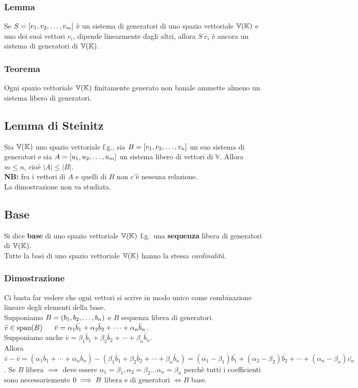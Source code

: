 \documentclass[../main.tex]{subfiles}
\begin{document}
\subsubsection{Lemma}
Se $S = [v_1, v_2, \ldots, v_{m}]$ è un sistema di generatori di uno spazio vettoriale $\mathbb{V} (\mathbb{K})$ e
uno dei suoi vettori $v_i$, dipende linearmente dagli altri, allora $S \ {v_i}$
è ancora un sistema di generatori di $\mathbb{V} (\mathbb{K})$.

\subsubsection{Teorema}
Ogni spazio vettoriale $\mathbb{V} (\mathbb{K})$ finitamente generato non banale ammette almeno un
sistema libero di generatori.

\subsection{Lemma di Steinitz}
Sia $\mathbb{V} (\mathbb{K})$ uno spazio vettoriale f.g., sia $B=[v_1, v_2, \ldots, v_{n}]$ un suo sistema di
generatori e sia $A=[u_1, u_2, \ldots, u_{m}]$ un sistema libero di vettori di $\mathbb V$.
Allora $m\leq n$, cioè $|A|\leq|B|$.\\ \textbf{NB:} fra i vettori di $A$ e
quelli di $B$ non c'è nessuna relazione.\\ La dimostrazione non va studiata.

\subsection{Base}
Si dice \textbf{base} di uno spazio vettoriale $\mathbb{V} (\mathbb{K})$ f.g.\ una \textbf{sequenza}
libera di generatori di $\mathbb{V} (\mathbb{K})$. \\ Tutte la basi di uno spazio vettoriale $\mathbb{V} (\mathbb{K})$
hanno la stessa \textit{cardinalità}.

\subsubsection{Dimostrazione}
Ci basta far vedere che ogni vettori si scrive in modo unico come combinazione
lineare degli elementi della base.\\ Supponiamo $B=(b_1, b_2, \ldots, b_{n})$ e $B$ sequenza
libera di generatori.\\ $\bar v \in \operatorname{span}(B) \ \ \ \ \ \bar v =
    \alpha_1\bar{b_1}+\alpha_2\bar b_2 + \cdots +\alpha_n\bar b_n$.\\ Supponiamo
anche $\bar v = \beta_1\bar b_1+\beta_2\bar b_2 + \cdots +\beta_n\bar b_n$.\\
Allora $\bar{v}-\bar v = (\alpha_1\bar b_1+\cdots+\alpha_n\bar b_n) -
    (\beta_1\bar b_1+\beta_2\bar b_2 + \cdots +\beta_n\bar b_n) =
    (\alpha_1-\beta_1)\bar{b_1}+(\alpha_2-\beta_2)\bar{b_2}+\cdots+(\alpha_n-\beta_n)\bar{v_n}$.
Se $B$ libera $\implies$ deve essere $\alpha_1 = \beta_1, \alpha_2 = \beta_2
    \ldots \alpha_n = \beta_n$ perchè tutti i coefficienti sono necessariemente
$0\\ \implies B$ libera e di generatori $\iff B$ base.
\end{document}
